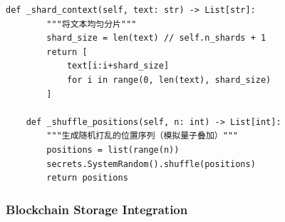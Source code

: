 \begin{lstlisting}[style=python,
  caption={量子指纹生成器（v4.0新增，密码学模拟量子态）
    · DNA: \#龍芯⚡️2026-03-10-QUANTUM-v4.0},
  label={lst:quantum}]
    def _shard_context(self, text: str) -> List[str]:
        """将文本均匀分片"""
        shard_size = len(text) // self.n_shards + 1
        return [
            text[i:i+shard_size]
            for i in range(0, len(text), shard_size)
        ]
    
    def _shuffle_positions(self, n: int) -> List[int]:
        """生成随机打乱的位置序列（模拟量子叠加）"""
        positions = list(range(n))
        secrets.SystemRandom().shuffle(positions)
        return positions
\end{lstlisting}

\subsubsection{Blockchain Storage Integration}

